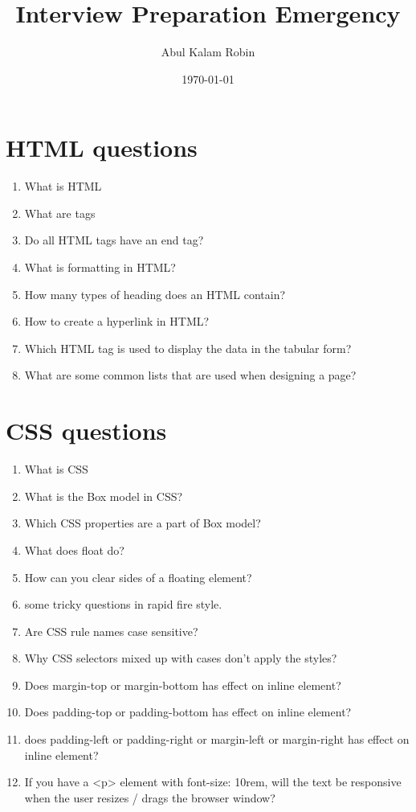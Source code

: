 \documentclass[11pt]{article}
\author{Abul Kalam Robin}
\date{\today}
\title{Interview Preparation Emergency}
\begin{document}
\maketitle
\tableofcontents


\section{HTML questions}
\label{sec:org9b905b8}
\begin{enumerate}
\item What is HTML
\item What are tags
\item Do all HTML tags have an end tag?
\item What is formatting in HTML?
\item How many types of heading does an HTML contain?
\item How to create a hyperlink in HTML?
\item Which HTML tag is used to display the data in the tabular form?
\item What are some common lists that are used when designing a page?
\end{enumerate}

\section{CSS questions}
\label{sec:orge37638e}
\begin{enumerate}
\item What is CSS
\item What is the Box model in CSS?
\item Which CSS properties are a part of Box model?
\item What does float do?
\item How can you clear sides of a floating element?
\item some tricky questions in rapid fire style.
\item Are CSS rule names case sensitive?
\item Why CSS selectors mixed up with cases don't apply the styles?
\item Does margin-top or margin-bottom has effect on inline element?
\item Does padding-top or padding-bottom has effect on inline element?
\item does padding-left or padding-right or margin-left or margin-right has effect on inline element?
\item If you have a <p> element with font-size: 10rem, will the text be responsive when the user resizes / drags the browser window?
\end{enumerate}
\end{document}
